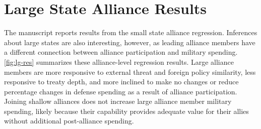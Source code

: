 \documentclass[12pt]{article}
\begin{document}
%


\section{Large State Alliance Results} 

The manuscript reports results from the small state alliance regression. 
Inferences about large states are also interesting, however, as leading alliance members have a different connection between alliance participation and military spending.
\autoref{fig:lg-res} summarizes these alliance-level regression results.   
Large alliance members are more responsive to external threat and foreign policy similarity, less responsive to treaty depth, and more inclined to make no changes or reduce percentage changes in defense spending as a result of alliance participation.
Joining shallow alliances does not increase large alliance member military spending, likely because their capability provides adequate value for their allies without additional post-alliance spending. 
\end{document}
